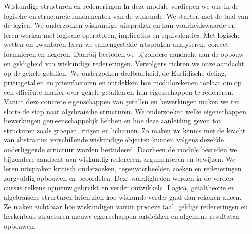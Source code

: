 
\ifdefined\HCode
\else
  \FVDmoduleopening
    {Wiskundige structuren en redeneringen}
    {In deze module verdiepen we ons in de logische en structurele fundamenten van de wiskunde. We starten met de taal van de logica. We onderzoeken wiskundige uitspraken en hun waarheidswaarde en leren werken met logische operatoren, implicaties en equivalenties. Met logische wetten en kwantoren leren we samengestelde uitspraken analyseren, correct formuleren en negeren. Daarbij besteden we bijzondere aandacht aan de opbouw en geldigheid van wiskundige redeneringen. Vervolgens richten we onze aandacht op de gehele getallen. We onderzoeken deelbaarheid, de Euclidische deling, priemgetallen en priemfactoren en ontdekken hoe modulorekenen toelaat om op een efficiënte manier over gehele getallen en hun eigenschappen te redeneren. Vanuit deze concrete eigenschappen van getallen en bewerkingen maken we ten slotte de stap naar algebraïsche structuren. We onderzoeken welke eigenschappen bewerkingen gemeenschappelijk hebben en hoe deze aanleiding geven tot structuren zoals groepen, ringen en lichamen. Zo maken we kennis met de kracht van abstractie: verschillende wiskundige objecten kunnen volgens dezelfde onderliggende structuur worden bestudeerd. Doorheen de module besteden we bijzondere aandacht aan wiskundig redeneren, argumenteren en bewijzen. We leren uitspraken kritisch onderzoeken, tegenvoorbeelden zoeken en redeneringen zorgvuldig opbouwen en beoordelen. Deze vaardigheden worden in de verdere cursus telkens opnieuw gebruikt en verder ontwikkeld. Logica, getaltheorie en algebraïsche structuren laten zien hoe wiskunde verder gaat dan rekenen alleen. Ze maken zichtbaar hoe wiskundigen vanuit precieze taal, geldige redeneringen en herkenbare structuren nieuwe eigenschappen ontdekken en algemene resultaten opbouwen.}
    {%
    }
\fi
